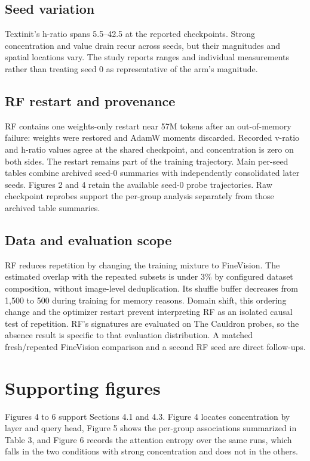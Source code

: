 \documentclass{article}
\begin{document}
\subsection{Seed variation}

Textinit's h-ratio spans 5.5--42.5 at the reported checkpoints. Strong concentration and value drain recur across seeds, but their magnitudes and spatial locations vary. The study reports ranges and individual measurements rather than treating seed 0 as representative of the arm's magnitude.

\subsection{RF restart and provenance}

RF contains one weights-only restart near 57M tokens after an out-of-memory failure: weights were restored and AdamW moments discarded. Recorded v-ratio and h-ratio values agree at the shared checkpoint, and concentration is zero on both sides. The restart remains part of the training trajectory. Main per-seed tables combine archived seed-0 summaries with independently consolidated later seeds. Figures 2 and 4 retain the available seed-0 probe trajectories. Raw checkpoint reprobes support the per-group analysis separately from those archived table summaries.

\subsection{Data and evaluation scope}

RF reduces repetition by changing the training mixture to FineVision. The estimated overlap with the repeated subsets is under 3\% by configured dataset composition, without image-level deduplication. Its shuffle buffer decreases from 1,500 to 500 during training for memory reasons. Domain shift, this ordering change and the optimizer restart prevent interpreting RF as an isolated causal test of repetition. RF's signatures are evaluated on The Cauldron probes, so the absence result is specific to that evaluation distribution. A matched fresh/repeated FineVision comparison and a second RF seed are direct follow-ups.

\FloatBarrier
\clearpage
\section{Supporting figures}

Figures 4 to 6 support Sections 4.1 and 4.3. Figure 4 locates concentration by layer and query head, Figure 5 shows the per-group associations summarized in Table 3, and Figure 6 records the attention entropy over the same runs, which falls in the two conditions with strong concentration and does not in the others.
\end{document}
